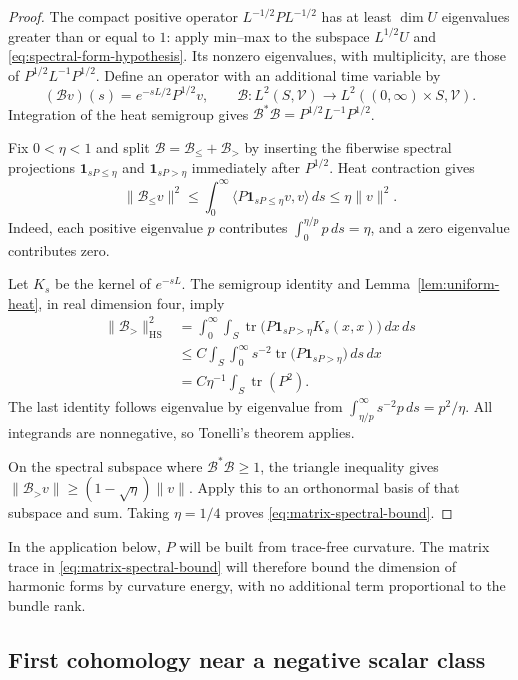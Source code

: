 \begin{proof}
The compact positive operator $L^{-1/2}PL^{-1/2}$ has at least
$\dim U$ eigenvalues greater than or equal to $1$: apply min--max
to the subspace $L^{1/2}U$ and
\eqref{eq:spectral-form-hypothesis}.  Its nonzero eigenvalues,
with multiplicity, are those of $P^{1/2}L^{-1}P^{1/2}$.
Define an operator with an additional time variable by
\[
 (\mathcal Bv)(s)=e^{-sL/2}P^{1/2}v,
 \qquad
 \mathcal B:L^2(S,\mathcal V)\longrightarrow
 L^2((0,\infty)\times S,\mathcal V).
\]
Integration of the heat semigroup gives
$\mathcal B^*\mathcal B=P^{1/2}L^{-1}P^{1/2}$.

Fix $0<\eta<1$ and split $\mathcal B=\mathcal B_{\le}+\mathcal B_>$
by inserting the fiberwise spectral projections
$\mathbf1_{sP\le\eta}$ and $\mathbf1_{sP>\eta}$ immediately after
$P^{1/2}$.  Heat contraction gives
\[
 \|\mathcal B_{\le}v\|^2
 \le\int_0^\infty\langle P\mathbf1_{sP\le\eta}v,v\rangle\,ds
 \le\eta\|v\|^2.
\]
Indeed, each positive eigenvalue $p$ contributes
$\int_0^{\eta/p}p\,ds=\eta$, and a zero eigenvalue contributes zero.

Let $K_s$ be the kernel of $e^{-sL}$.  The semigroup identity and
Lemma~\ref{lem:uniform-heat}, in real dimension four, imply
\begin{align*}
 \|\mathcal B_>\|_{\mathrm{HS}}^2
 &=\int_0^\infty\int_S
   \operatorname{tr}\bigl(P\mathbf1_{sP>\eta}K_s(x,x)\bigr)\,dx\,ds\\
 &\le C\int_S\int_0^\infty
   s^{-2}\operatorname{tr}\bigl(P\mathbf1_{sP>\eta}\bigr)\,ds\,dx\\
 &=C\eta^{-1}\int_S\operatorname{tr}(P^2).
\end{align*}
The last identity follows eigenvalue by eigenvalue from
$\int_{\eta/p}^\infty s^{-2}p\,ds=p^2/\eta$.
All integrands are nonnegative, so Tonelli's theorem applies.

On the spectral subspace where $\mathcal B^*\mathcal B\ge1$,
the triangle inequality gives
$\|\mathcal B_>v\|\ge(1-\sqrt\eta)\|v\|$.
Apply this to an orthonormal basis of that subspace and sum.
Taking $\eta=1/4$ proves \eqref{eq:matrix-spectral-bound}.
\end{proof}

In the application below, $P$ will be built from trace-free curvature.
The matrix trace in \eqref{eq:matrix-spectral-bound} will therefore
bound the dimension of harmonic forms by curvature energy, with no
additional term proportional to the bundle rank.

\subsection{First cohomology near a negative scalar class}

